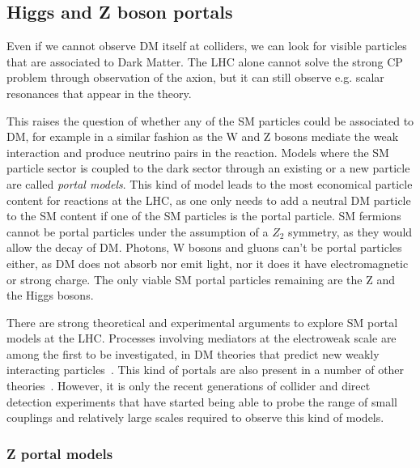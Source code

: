 \subsection{Higgs and Z boson portals}
\label{sec:HZPortalModels}

Even if we cannot observe DM itself at colliders, we can look for visible particles that are associated to Dark Matter. The LHC alone cannot solve the strong CP problem through observation of the axion, but it can still observe e.g. scalar resonances that appear in the theory. %

This raises the question of whether any of the SM particles could be associated to DM, for example in a similar fashion as the W and Z bosons mediate the weak interaction and produce neutrino pairs in the reaction. Models where the SM particle sector is coupled to the dark sector through an existing or a new particle are called \textit{portal models}. This kind of model leads to the most economical particle content for reactions at the LHC, as one only needs to add a neutral DM particle to the SM content if one of the SM particles is the portal particle. SM fermions cannot be portal particles under the assumption of a $Z_2$ symmetry, as they would allow the decay of DM. Photons, W bosons and gluons can't be portal particles either, as DM does not absorb nor emit light, nor it does it have electromagnetic or strong charge. The only viable SM portal particles remaining are the Z and the Higgs bosons. 

There are strong theoretical and experimental arguments to explore SM portal models at the LHC. 
Processes involving mediators at the electroweak scale are among the first to be investigated, in DM theories that predict new weakly interacting particles~\cite{Cotta:2012nj}. This kind of portals are also present in a number of other theories~\cite{Arcadi:2014lta}. %
However, it is only the recent generations of collider and direct detection experiments that have started being able to probe the range of small couplings and relatively large scales required to observe this kind of models. 

\subsubsection{Z portal models}

